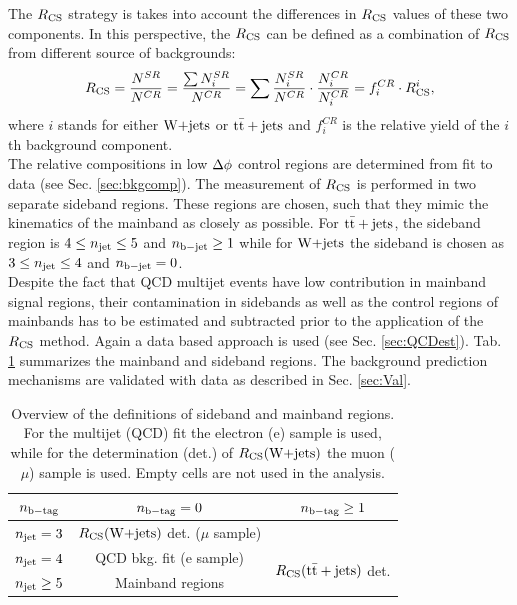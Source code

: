 The $R_{\rm CS}$ strategy is takes into account the differences in $R_{\rm CS}$ values of these two components.
In this perspective, the $R_{\rm CS}$ can be defined as a combination of $R_{\rm CS}$ from different source of backgrounds:
\begin{equation}
\label{eq:rcs_frac}
R_{\rm CS} = \frac{N^{SR}}{N^{CR}} = \frac{\sum N^{SR}_i}{N^{CR}} = \sum \frac{ N^{SR}_i}{N^{CR}} \cdot \frac{ N^{CR}_i}{N^{CR}_i} = f^{CR}_i \cdot R_{\rm CS}^i,
\end{equation}
where $i$ stands for either $\textrm{W+jets}$ or ${\rm t\bar{t}+jets}$ and $f^{CR}_i$ is the relative yield of the $i$th background component.\\
The relative compositions in low $\Delta \phi$ control regions are determined from fit to data (see Sec. \ref{sec:bkgcomp}). The measurement of $R_{\rm CS}$ is performed in two separate sideband regions. These regions are chosen, such that they mimic the kinematics of the mainband as closely as possible.
For ${\rm t\bar{t}+jets}$, the sideband region is $4\leq n_{\rm jet}\leq5$ and $n_{\rm b-jet}\geq1$ while for $\textrm{W+jets}$ the sideband is chosen as $3\leq n_{\rm jet}\leq4$ and $n_{\rm b-jet}=0$.\\
Despite the fact that QCD multijet events have low contribution in mainband signal regions, their contamination in sidebands as well as the control regions of mainbands has to be estimated and subtracted prior to the application of the $R_{\rm CS}$ method. Again a data based approach is used (see Sec. \ref{sec:QCDest}).
Tab. \ref{tab:SBMBRegions} summarizes the mainband and sideband regions.
The background prediction mechanisms are validated with data as described in Sec. \ref{sec:Val}.
\begin{table}[!htb]
\caption[Overview of the definitions of sideband and mainband regions]{Overview of the definitions of sideband and mainband regions.
For the multijet (QCD) fit the electron (e) sample is used, while for the determination (det.)
of $R_{\rm CS}(\textrm{W+jets})$ the muon ($\mu$) sample is used. Empty cells are not used in the analysis.
}
\label{tab:SBMBRegions}
\centering
\begin{tabular}{c|c|c}
$n_{\rm b-tag}$       & $n_{\rm b-tag} = 0$                                    &  $n_{\rm b-tag}\geq1$\\ \hline
$n_{\rm jet}=3$      &  $R_{\rm CS}(\textrm{W+jets})$ det. ($\mu$ sample)& \\ \cline{1-1}  \cline{3-3}
$n_{\rm jet}=4$      &  QCD bkg. fit (e sample)  & \multirow{2}{*}{$R_{\rm CS}({\rm t\bar{t}+jets})$ det.} \\\cline{1-2}
$n_{\rm jet}\geq5$ & Mainband regions &  \\ \hline
\end{tabular}
\end{table}
